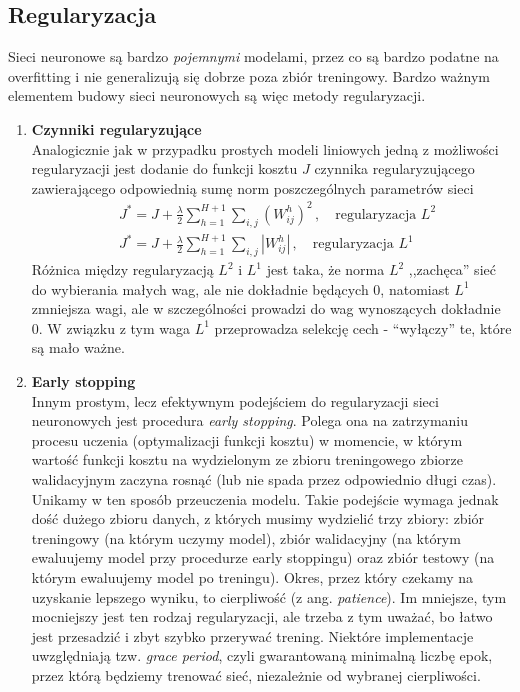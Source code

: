 \documentclass{myclass}
\begin{document}
\subsection{Regularyzacja}

Sieci neuronowe są bardzo \textit{pojemnymi} modelami, przez co są bardzo podatne na overfitting i
nie generalizują się dobrze poza zbiór treningowy. Bardzo ważnym elementem budowy sieci neuronowych
są więc metody regularyzacji. 

\begin{enumerate}
    \item \textbf{Czynniki regularyzujące}\\
    Analogicznie jak w przypadku prostych modeli liniowych jedną z możliwości regularyzacji jest
    dodanie do funkcji kosztu \(J\) czynnika regularyzującego zawierającego odpowiednią sumę norm
    poszczególnych parametrów sieci
    \begin{equation*}
        \begin{split}
            &J^* = J + \frac{\lambda}{2}\sum_{h=1}^{H+1}\sum_{i,j} \left(W_{ij}^h\right)^2\,,\quad\text{regularyzacja \(L^2\)}\\
            &J^* = J + \frac{\lambda}{2}\sum_{h=1}^{H+1}\sum_{i,j} \left|W_{ij}^h\right|\,,\quad\text{regularyzacja \(L^1\)}
        \end{split}
    \end{equation*}
    Różnica między regularyzacją \(L^2\) i \(L^1\) jest taka, że norma \(L^2\) ,,zachęca” sieć do
    wybierania małych wag, ale nie dokładnie będących 0, natomiast \(L^1\) zmniejsza wagi, ale w
    szczególności prowadzi do wag wynoszących dokładnie 0. W związku z tym waga \(L^1\) przeprowadza
    selekcję cech - “wyłączy” te, które są mało ważne.

    \item \textbf{Early stopping}\\
    Innym prostym, lecz efektywnym podejściem do regularyzacji sieci neuronowych jest procedura
    \textit{early stopping}. Polega ona na zatrzymaniu procesu uczenia (optymalizacji funkcji
    kosztu) w momencie, w którym wartość funkcji kosztu na wydzielonym ze zbioru treningowego
    zbiorze walidacyjnym zaczyna rosnąć (lub nie spada przez odpowiednio długi czas). Unikamy w ten
    sposób przeuczenia modelu. Takie podejście wymaga jednak dość dużego zbioru danych, z których
    musimy wydzielić trzy zbiory: zbiór treningowy (na którym uczymy model), zbiór walidacyjny (na
    którym ewaluujemy model przy procedurze early stoppingu) oraz zbiór testowy (na którym
    ewaluujemy model po treningu). Okres, przez który czekamy na uzyskanie lepszego wyniku, to
    cierpliwość (z ang. \textit{patience}). Im mniejsze, tym mocniejszy jest ten rodzaj
    regularyzacji, ale trzeba z tym uważać, bo łatwo jest przesadzić i zbyt szybko przerywać
    trening. Niektóre implementacje uwzględniają tzw. \textit{grace period}, czyli gwarantowaną
    minimalną liczbę epok, przez którą będziemy trenować sieć, niezależnie od wybranej cierpliwości.


\end{enumerate}
\end{document}
